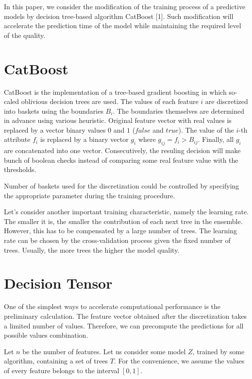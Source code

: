 \documentclass[a4paper]{jpconf}
\begin{document}
In this paper, we consider the modification of the training process of a predictive models by decision tree-based algorithm CatBoost [1]. Such modification will accelerate the prediction time of the model while maintaining the required level of the quality.

\section{CatBoost}

CatBoost is the implementation of a tree-based gradient boosting in which so-caled oblivious decision trees are used. The values of each feature $i$ are discretized into baskets using the boundaries $B_i$. The boundaries themselves are determined in advance using various heuristic.
Original feature vector with real values is replaced by a vector binary values $0$ and $1$ ($false$ and $true$). The value of the $i$-th attribute $f_i$ is replaced by a binary vector $g_i$ where $g_{ij} = f_i > B_{ij}$. Finally, all $g_i$ are concatenated into one vector. Consecutively, the resuling decision will make bunch of boolean checks instead of comparing some real feature value with the thresholds.

Number of baskets used for the discretization could be controlled by specifying the appropriate parameter during the training procedure.

Let's consider another important training characteristic, namely the learning rate. The smaller it is, the smaller the contribution of each next tree in the ensemble. However, this has to be compensated by a large number of trees. The learning rate can be chosen by the cross-validation process given the fixed number of trees. Usually, the more trees the higher the model quality.

\section{Decision Tensor}
One of the simplest ways to accelerate computational performance is the preliminary calculation. The feature vector obtained after the discretization takes a limited number of values. Therefore, we can precompute the predictions for all possible values combination.

Let $n$ be the number of features. Let us consider some model $Z$, trained by some algorithm, containing a set of trees $T$. For the convenience, we assume the values of every feature belongs to the interval $[0, 1]$.
\end{document}
